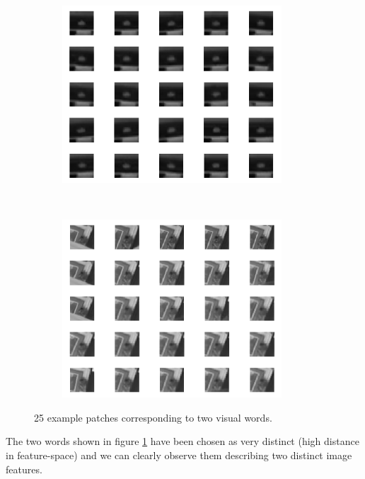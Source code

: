 \documentclass{paper}
\begin{document}
\begin{figure}[h!]
    \centering
    \begin{subfigure}[]{0.5\textwidth}
        \centering
        \includegraphics[width=0.9\textwidth]{examplesWord1.png}
    \end{subfigure}%
    ~ 
    \begin{subfigure}[]{0.5\textwidth}
        \centering
        \includegraphics[width=0.9\textwidth]{examplesWord3.png}
    \end{subfigure}
    \caption{25 example patches corresponding to two visual words.}
\label{fig:vocab}
\end{figure}

The two words shown in figure \ref{fig:vocab} have been chosen as very distinct (high distance in feature-space) and we can clearly observe them describing two distinct image features.
\end{document}
